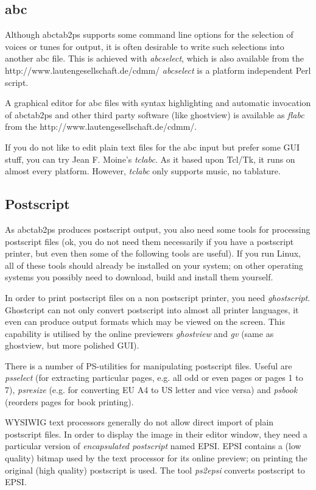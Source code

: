\documentclass[a4paper]{article}
\begin{document}
\subsection{abc}
Although abctab2ps supports some command line options for the
selection of voices or tunes for output, it is often desirable
to write such selections into another abc file. This is achieved
with {\it abcselect}, which is also available from the
{http://www.lautengesellschaft.de/cdmm/}
{\it abcselect} is a platform independent Perl script.
\par
A graphical editor for abc files with syntax highlighting and automatic
invocation of abctab2ps and other third party software (like ghostview)
is available as {\em flabc} from the 
{http://www.lautengesellschaft.de/cdmm/}.
\par
If you do not like to edit plain text files for the abc input
but prefer some GUI stuff, you can try Jean F. Moine's {\it tclabc}.
As it based upon Tcl/Tk, it runs on almost every platform.
However, {\it tclabc} only supports music, no tablature.

\subsection{Postscript}
 
As abctab2ps produces postscript output, you also need some tools 
for processing postscript files (ok, you do not need them necessarily
if you have a postscript printer, but even then some of the following tools 
are useful). If you run Linux, all of these tools should already
be installed on your system; on other operating systems you
possibly need to download, build and install them yourself. 
\par
In order to print postscript files on a non postscript printer,
you need {\it ghostscript}. Ghostcript can not only convert postscript
into almost all printer languages, it even can produce output formats which
may be viewed on the screen. This capability is utilised by the online
previewers {\it ghostview} and {\it gv} (same as ghostview,
but more polished GUI).
\par
There is a number of PS-utilities for manipulating postscript files.
Useful are {\it psselect} (for extracting particular pages, e.g. all
odd or even pages or pages 1 to 7),
{\it psresize} (e.g. for converting EU A4 to US letter and 
vice versa) and {\it psbook} (reorders pages for book printing).
\par
WYSIWIG text processors generally do not allow direct import of plain 
postscript files. In order to display the image in their editor
window, they need a particular version of {\it encapsulated postscript}
named EPSI. EPSI contains a (low quality) bitmap used by the text 
processor for its online preview; on printing the original (high quality)
postscript is used. The tool {\it ps2epsi} converts postscript
to EPSI.
\end{document}
